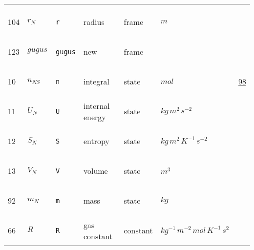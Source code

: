 \begin{longtable}{|p{1cm}|p{3cm}|p{5cm}|p{7.5cm}|p{3.0cm}|p{3cm}|p{1cm}|}
             & \\
    104
             & \hypertarget{"v:104"}{ $ {r}_{N} $}
             & \verb|r|
             & radius
             & \begin{lay}frame \end{lay}
             & $ m  $
             & \\
    123
             & \hypertarget{"v:123"}{ $ {gugus}_{} $}
             & \verb|gugus|
             &  new 
             & \begin{lay}frame \end{lay}
             & $  $
             & \\
    10
             & \hypertarget{"v:10"}{ $ {n}_{{N S}} $}
             & \verb|n|
             & integral 
             & \begin{lay}state \end{lay}
             & $ mol \, $
             & \hyperlink{"e:98"}{ 98 }
                 \\
    11
             & \hypertarget{"v:11"}{ $ {U}_{N} $}
             & \verb|U|
             & internal energy
             & \begin{lay}state \end{lay}
             & $ kg \,m^{2} \,s^{-2} \, $
             & \\
    12
             & \hypertarget{"v:12"}{ $ {S}_{N} $}
             & \verb|S|
             & entropy
             & \begin{lay}state \end{lay}
             & $ kg \,m^{2} \,K^{-1} \,s^{-2} \, $
             & \\
    13
             & \hypertarget{"v:13"}{ $ {V}_{N} $}
             & \verb|V|
             & volume
             & \begin{lay}state \end{lay}
             & $ m^{3} \, $
             & \\
    92
             & \hypertarget{"v:92"}{ $ {m}_{N} $}
             & \verb|m|
             & mass
             & \begin{lay}state \end{lay}
             & $ kg \, $
             & \\
    66
             & \hypertarget{"v:66"}{ $ {R}_{} $}
             & \verb|R|
             & gas constant
             & \begin{lay}constant \end{lay}
             & $ kg^{-1} \,m^{-2} \,mol \,K^{-1} \,s^{2} \, $

\end{longtable}
